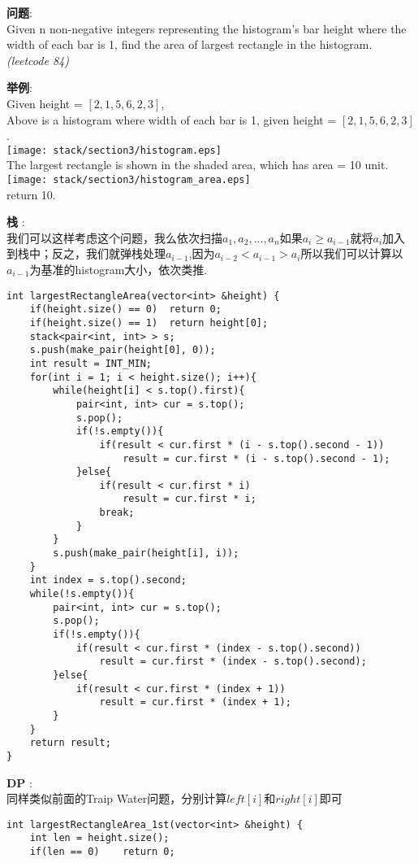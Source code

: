     
\begin{description}
    \item{\textbf{问题}}:\\
Given n non-negative integers representing the histogram's bar height where the width of each bar is 1, find the area of largest rectangle in the histogram.\\
\textit{(leetcode 84)}
    \item{\textbf{举例}}:\\
Given height = $[2,1,5,6,2,3]$, \\
Above is a histogram where width of each bar is 1, given height = $[2,1,5,6,2,3]$.\\
\texttt{[image: stack/section3/histogram.eps]} \\
The largest rectangle is shown in the shaded area, which has area = 10 unit. \\
\texttt{[image: stack/section3/histogram\_area.eps]} \\
return 10.
    \item{\textbf{栈}} : 
    \\我们可以这样考虑这个问题，我么依次扫描$a_1, a_2, ..., a_n$如果$a_i \ge a_{i-1}$就将$a_i$加入到栈中；反之，我们就弹栈处理$a_{i-1}$,因为$a_{i-2} < a_{i-1} > a_i$所以我们可以计算以$a_{i-1}$为基准的histogram大小，依次类推.
    \begin{lstlisting}
int largestRectangleArea(vector<int> &height) {
	if(height.size() == 0)	return 0;
	if(height.size() == 1)	return height[0];
	stack<pair<int, int> > s;
	s.push(make_pair(height[0], 0));
	int result = INT_MIN;
	for(int i = 1; i < height.size(); i++){
		while(height[i] < s.top().first){
			pair<int, int> cur = s.top();
			s.pop();
			if(!s.empty()){
				if(result < cur.first * (i - s.top().second - 1))
					result = cur.first * (i - s.top().second - 1);
			}else{
				if(result < cur.first * i)
					result = cur.first * i;
				break;
			}
		}
		s.push(make_pair(height[i], i));
	}
	int index = s.top().second;
	while(!s.empty()){
		pair<int, int> cur = s.top();
		s.pop();
		if(!s.empty()){
			if(result < cur.first * (index - s.top().second))
				result = cur.first * (index - s.top().second);
		}else{
			if(result < cur.first * (index + 1))
				result = cur.first * (index + 1);
		}
	}
	return result;
}
    \end{lstlisting}
    \item{\textbf{DP}} : 
	\\同样类似前面的Traip Water问题，分别计算$left[i]和right[i]$即可
    \begin{lstlisting}
int largestRectangleArea_1st(vector<int> &height) {
	int len = height.size();
	if(len == 0)	return 0;


\end{lstlisting}
\end{description}
